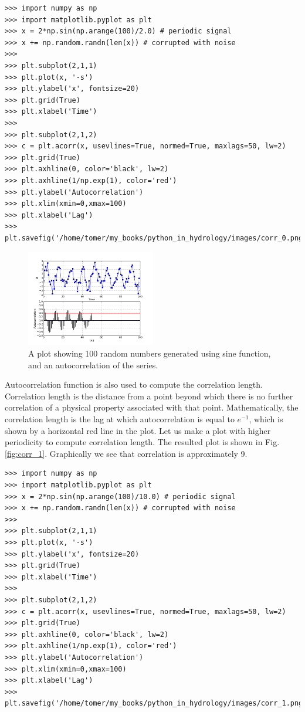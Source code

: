 \documentclass[10pt]{book}
\begin{document}
{\beforeverb \begin{verbatim}
>>> import numpy as np
>>> import matplotlib.pyplot as plt
>>> x = 2*np.sin(np.arange(100)/2.0) # periodic signal
>>> x += np.random.randn(len(x)) # corrupted with noise
>>> 
>>> plt.subplot(2,1,1)
>>> plt.plot(x, '-s')
>>> plt.ylabel('x', fontsize=20)
>>> plt.grid(True)
>>> plt.xlabel('Time')
>>> 
>>> plt.subplot(2,1,2)
>>> c = plt.acorr(x, usevlines=True, normed=True, maxlags=50, lw=2)
>>> plt.grid(True)
>>> plt.axhline(0, color='black', lw=2)
>>> plt.axhline(1/np.exp(1), color='red')
>>> plt.ylabel('Autocorrelation')
>>> plt.xlim(xmin=0,xmax=100)
>>> plt.xlabel('Lag')
>>> plt.savefig('/home/tomer/my_books/python_in_hydrology/images/corr_0.png')
\end{verbatim} \afterverb

\beforefig
\begin{figure}[h!]
  \centering
    \includegraphics[width=0.5\textwidth]{images/corr_0.png}
  \caption{A plot showing 100 random numbers generated using sine function, and an autocorrelation of the series.}
   \label{fig:corr_0}
\end{figure}
\afterfig

Autocorrelation function is also used to compute the correlation length. Correlation length is the distance from a point beyond which
there is no further correlation of a physical property associated with that point. Mathematically, the correlation length is the lag at which autocorrelation is equal to $e^{-1}$, which is shown by a horizontal red line in the plot. Let us make a plot with higher periodicity to compute correlation length. The resulted plot is shown in Fig. \ref{fig:corr_1}. Graphically we see that correlation is approximately 9. 

\beforeverb \begin{verbatim}
>>> import numpy as np
>>> import matplotlib.pyplot as plt
>>> x = 2*np.sin(np.arange(100)/10.0) # periodic signal
>>> x += np.random.randn(len(x)) # corrupted with noise
>>> 
>>> plt.subplot(2,1,1)
>>> plt.plot(x, '-s')
>>> plt.ylabel('x', fontsize=20)
>>> plt.grid(True)
>>> plt.xlabel('Time')
>>> 
>>> plt.subplot(2,1,2)
>>> c = plt.acorr(x, usevlines=True, normed=True, maxlags=50, lw=2)
>>> plt.grid(True)
>>> plt.axhline(0, color='black', lw=2)
>>> plt.axhline(1/np.exp(1), color='red')
>>> plt.ylabel('Autocorrelation')
>>> plt.xlim(xmin=0,xmax=100)
>>> plt.xlabel('Lag')
>>> plt.savefig('/home/tomer/my_books/python_in_hydrology/images/corr_1.png')
\end{verbatim} \afterverb

}
\end{document}
